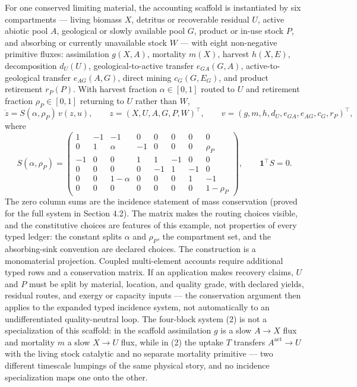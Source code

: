 \documentclass[11pt]{article}
\begin{document}
For one conserved limiting material, the accounting scaffold is
instantiated by six compartments --- living biomass \(X\), detritus or
recoverable residual \(U\), active abiotic pool \(A\), geological or
slowly available pool \(G\), product or in-use stock \(P\), and
absorbing or currently unavailable stock \(W\) --- with eight
non-negative primitive fluxes: assimilation \(g(X,A)\), mortality
\(m(X)\), harvest \(h(X,E)\), decomposition \(d_U(U)\),
geological-to-active transfer \(e_{GA}(G,A)\), active-to-geological
transfer \(e_{AG}(A,G)\), direct mining \(c_G(G,E_G)\), and product
retirement \(r_P(P)\). With harvest fraction \(\alpha \in [0,1]\) routed
to \(U\) and retirement fraction \(\rho_P \in [0,1]\) returning to \(U\)
rather than \(W\),
\[\dot z = S(\alpha, \rho_P)\, v(z, u), \qquad z = (X, U, A, G, P, W)^\top, \qquad v = (g, m, h, d_U, e_{GA}, e_{AG}, c_G, r_P)^\top,\]
where \[S(\alpha, \rho_P) =
\begin{pmatrix}
1 & -1 & -1 & 0 & 0 & 0 & 0 & 0 \\
0 & 1 & \alpha & -1 & 0 & 0 & 0 & \rho_P \\
-1 & 0 & 0 & 1 & 1 & -1 & 0 & 0 \\
0 & 0 & 0 & 0 & -1 & 1 & -1 & 0 \\
0 & 0 & 1-\alpha & 0 & 0 & 0 & 1 & -1 \\
0 & 0 & 0 & 0 & 0 & 0 & 0 & 1-\rho_P
\end{pmatrix}, \qquad \mathbf{1}^\top S = 0.\] The zero column sums are
the incidence statement of mass conservation (proved for the full system
in Section 4.2). The matrix makes the routing choices visible, and the
constitutive choices are features of this example, not properties of
every typed ledger: the constant splits \(\alpha\) and \(\rho_P\), the
compartment set, and the absorbing-sink convention are declared choices.
The construction is a monomaterial projection. Coupled multi-element
accounts require additional typed rows and a conservation matrix. If an
application makes recovery claims, \(U\) and \(P\) must be split by
material, location, and quality grade, with declared yields, residual
routes, and exergy or capacity inputs --- the conservation argument then
applies to the expanded typed incidence system, not automatically to an
undifferentiated quality-neutral loop. The four-block system (2) is not
a specialization of this scaffold: in the scaffold assimilation \(g\) is
a slow \(A \to X\) flux and mortality \(m\) a slow \(X \to U\) flux,
while in (2) the uptake \(T\) transfers \(A^{\mathrm{act}} \to U\) with
the living stock catalytic and no separate mortality primitive --- two
different timescale lumpings of the same physical story, and no
incidence specialization maps one onto the other.
\end{document}

